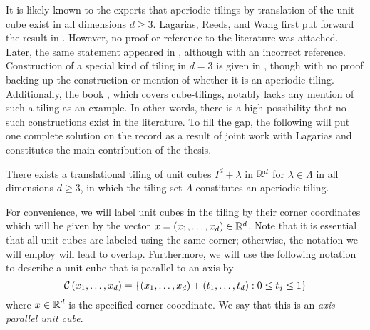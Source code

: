 \documentclass[../thesis.tex]{subfiles}
\begin{document}

It is likely known to the experts that aperiodic tilings by translation of the unit cube exist in all dimensions $d\geq3$. Lagarias, Reeds, and Wang first put forward the result in \cite{lagariasOrthonormalBasesExponentials2000}. However, no proof or reference to the literature was attached. Later, the same statement appeared in \cite{liuUniformityNonUniformGabor2003}, although with an incorrect reference. Construction of a special kind of tiling in $d=3$ is given in \cite{kolountzakisStudyTranslationalTiling2003}, though with no proof backing up the construction or mention of whether it is an aperiodic tiling. Additionally, the book \cite{zongCubeWindowConvex2006}, which covers cube-tilings, notably lacks any mention of such a tiling as an example. In other words, there is a high possibility that no such constructions exist in the literature. To fill the gap, the following will put one complete solution on the record as a result of joint work with Lagarias \cite{haugeAperiodicTilingTranslations2023} and constitutes the main contribution of the thesis. 

\begin{theorem}
    There exists a translational tiling of unit cubes $I^d + \lambda$ in $\mathbb{R}^d$ for $\lambda\in \Lambda$ in all dimensions $d\geq3$, in which the tiling set $\Lambda$ constitutes an aperiodic tiling.
\end{theorem}

For convenience, we will label unit cubes in the tiling by their corner coordinates which will be given by the vector $x = (x_1,\dots,x_d) \in \mathbb{R}^d$. Note that it is essential that all unit cubes are labeled using the same corner; otherwise, the notation we will employ will lead to overlap. Furthermore, we will use the following notation to describe a unit cube that is parallel to an axis by
\begin{equation*}
    \mathcal{C}\left(x_1,\dots,x_d\right) = \left\{(x_1,\dots,x_d) + (t_1,\dots,t_d) : 0 \leq t_j \leq 1\right\}
\end{equation*} 
where $x\in \mathbb{R}^d$ is the specified corner coordinate. We say that this is an \emph{axis-parallel unit cube}. 
\end{document}
